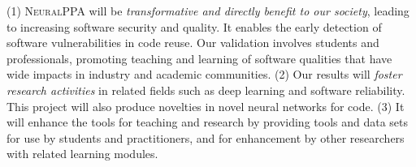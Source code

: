 \documentclass[11pt]{article}
\newcommand{\tool}{\textsc{NeuralPPA}\xspace}
\begin{document}
(1) {\tool} will be {\em transformative and directly benefit to our
  society}, leading to increasing software security and quality.
It enables the early detection of software vulnerabilities in code
reuse.
%
Our validation involves students and professionals, promoting teaching
and learning of software qualities that have wide impacts in industry
and academic communities. (2) Our results will {\em foster research
  activities} in related fields such as deep learning and software
reliability. This project will also produce novelties in novel neural
networks for code. (3) It will enhance the tools for
teaching and research by providing tools and data sets for use by
students and practitioners, and for enhancement by other
researchers with related learning modules.






\end{document}
